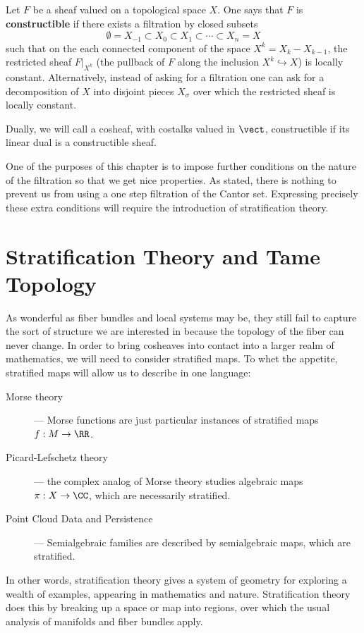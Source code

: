 \begin{defn}
	Let $F$ be a sheaf valued on a topological space $X$. One says that $F$ is \textbf{constructible} if there exists a filtration by closed subsets $$\emptyset=X_{-1}\subset X_0 \subset X_1 \subset \cdots \subset X_n=X$$ 
	such that on the each connected component of the space $X^k=X_k- X_{k-1}$, the restricted sheaf $F|_{X^k}$ (the pullback of $F$ along the inclusion $X^k\hookrightarrow X$) is locally constant. Alternatively, instead of asking for a filtration one can ask for a decomposition of $X$ into disjoint pieces $X_{\sigma}$ over which the restricted sheaf is locally constant.

	Dually, we will call a cosheaf, with costalks valued in $\vect$, constructible if its linear dual is a constructible sheaf.
\end{defn}

One of the purposes of this chapter is to impose further conditions on the nature of the filtration so that we get nice properties. As stated, there is nothing to prevent us from using a one step filtration of the Cantor set. Expressing precisely these extra conditions will require the introduction of stratification theory.

\section{Stratification Theory and Tame Topology}
\label{subsec:strat_thy_tame_topology}

As wonderful as fiber bundles and local systems may be, they still fail to capture the sort of structure we are interested in because the topology of the fiber can never change. In order to bring cosheaves into contact into a larger realm of mathematics, we will need to consider stratified maps. To whet the appetite, stratified maps will allow us to describe in one language:
\begin{description}
	\item[Morse theory] --- Morse functions are just particular instances of stratified maps $f:M\to \RR$.
	\item[Picard-Lefschetz theory] --- the complex analog of Morse theory studies algebraic maps $\pi:X\to\CC$, which are necessarily stratified.
	\item[Point Cloud Data and Persistence] --- Semialgebraic families are described by semialgebraic maps, which are stratified.
\end{description}
In other words, stratification theory gives a system of geometry for exploring a wealth of examples, appearing in mathematics and nature. Stratification theory does this by breaking up a space or map into regions, over which the usual analysis of manifolds and fiber bundles apply.

